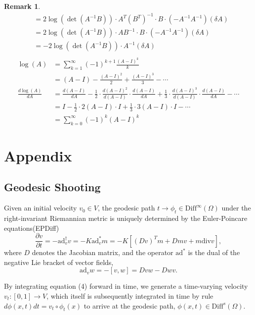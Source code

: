 \documentclass{article}
\theoremstyle{definition}
\theoremstyle{plain}
\newtheorem{remark}{Remark}
\begin{document}
\begin{remark}
\begin{align*}
    &=2\log(\det(A^{-1}B))\cdot A^T(B^T)^{-1}\cdot B\cdot(-A^{-1}A^{-1})(\delta A)\\
    &=2\log(\det(A^{-1}B))\cdot AB^{-1}\cdot B\cdot(-A^{-1}A^{-1})(\delta A)\\
    &=-2\log(\det(A^{-1}B))\cdot A^{-1}(\delta A)\\
\end{align*}
\begin{align*}
    \log(A)&=\sum^\infty_{k=1}(-1)^{k+1}\frac{(A-I)^k}{k}\\
    &=(A-I)-\frac{(A-I)^2}{2}+\frac{(A-I)^3}{3}-\cdots\\
    \frac{d\log(A)}{dA}&=\frac{d(A-I)}{dA}-\frac{1}{2}\cdot\frac{d(A-I)^2}{d(A-I)}\cdot\frac{d(A-I)}{dA}+\frac{1}{3}\cdot\frac{d(A-I)^3}{d(A-I)}\cdot\frac{d(A-I)}{dA}-\cdots\\
    &=I-\frac{1}{2}\cdot2(A-I)\cdot I+\frac{1}{3}\cdot3(A-I)\cdot I-\cdots\\
    &=\sum^\infty_{k=0}(-1)^k(A-I)^k
\end{align*}
\end{remark}

\section{Appendix}
\subsection{Geodesic Shooting}
Given an initial velocity $v_0\in V$, the geodesic path $t\rightarrow\phi_t\in\mathrm{Diff}^\infty(\Omega)$ under the right-invariant Riemannian metric is uniquely determined by the Euler-Poincare equations(EPDiff)
\begin{equation}
    \frac{\partial v}{\partial t}=-\mathrm{ad}^\dagger_v v=-K\mathrm{ad}^*_vm=-K[(Dv)^Tm+Dmv+m\mathrm{ div } v],
\end{equation}
where $D$ denotes the Jacobian matrix, and the operator $\mathrm{ad}^*$ is the dual of the negative Lie bracket of vector fields,
\begin{equation*}
    \mathrm{ad}_vw=-[v,w]=Dvw-Dwv.
\end{equation*}

By integrating equation (4) forward in time, we generate a time-varying velocity $v_t:[0,1]\rightarrow V$, which itself is subsequently integrated in time by rule $d\phi(x,t)dt=v_t\circ\phi_t(x)$ to arrive at the geodesic path, $\phi(x,t)\in\mathrm{Diff}^s(\Omega)$.
\end{document}
